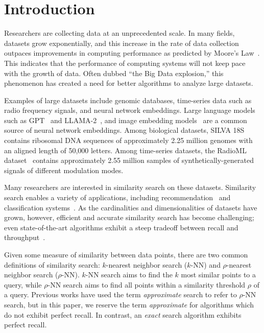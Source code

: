\section{Introduction}
\label{sec:introduction}

Researchers are collecting data at an unprecedented scale.
In many fields, datasets grow exponentially, and this increase in the rate of data collection outpaces improvements in computing performance as predicted by Moore's Law~\cite{kahn2011future}.
This indicates that the performance of computing systems will not keep pace with the growth of data.
Often dubbed ``the Big Data explosion,'' this phenomenon has created a need for better algorithms to analyze large datasets.

Examples of large datasets include genomic databases, time-series data such as radio frequency signals, and neural network embeddings.
Large language models such as GPT~\cite{2020arXiv200514165B, OpenAI2023GPT4TR} and LLAMA-2~\cite{Touvron2023Llama2O}, and image embedding models~\cite{radford2021learning, dosovitskiy2020image} are a common source of neural network embeddings.
Among biological datasets,  SILVA 18S~\cite{10.1093/nar/gks1219} contains ribosomal DNA sequences of approximately 2.25 million genomes with an aligned length of 50,000 letters.
Among time-series datasets, the RadioML dataset~\cite{oshea2018radioml} contains approximately 2.55 million samples of synthetically-generated signals of different modulation modes.

Many researchers are interested in similarity search on these datasets.
Similarity search enables a variety of applications, including recommendation~\cite{annoy} and classification systems~\cite{suyanto2022knnclassifier}.
As the cardinalities and dimensionalities of datasets have grown, however, efficient and accurate similarity search has become challenging;
even state-of-the-art algorithms exhibit a steep tradeoff between recall and throughput~\cite{malkov2016hnsw, johnson2019billion, annoy, aumuller2020ann}.

Given some measure of similarity between data points, there are two common definitions of similarity search: $k$-nearest neighbor search ($k$-NN) and $\rho$-nearest neighbor search ($\rho$-NN).
$k$-NN search aims to find the $k$ most similar points to a query, while $\rho$-NN search aims to find all points within a similarity threshold $\rho$ of a query.
Previous works have used the term \textit{approximate} search to refer to $\rho$-NN search, but in this paper, we reserve the term \textit{approximate} for algorithms which do not exhibit perfect recall.
In contrast, an \textit{exact} search algorithm exhibits perfect recall.

